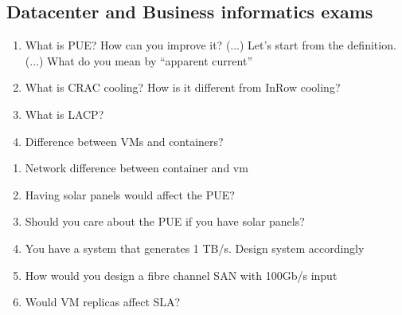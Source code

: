 \subsection{Datacenter and Business informatics exams}

\begin{enumerate}
  \item What is PUE? How can you improve it? (...) Let's start from the definition. (...) What do you mean by ``apparent current''
  \item What is CRAC cooling? How is it different from InRow cooling?
  \item What is LACP?
  \item Difference between VMs and containers?
\end{enumerate}

\begin{enumerate}
  \item Network difference between container and vm
  \item Having solar panels would affect the PUE?
  \item Should you care about the PUE if you have solar panels?
  \item You have a system that generates 1 TB/s. Design system accordingly
  \item How would you design a fibre channel SAN with 100Gb/s input
  \item Would VM replicas affect SLA?
\end{enumerate}